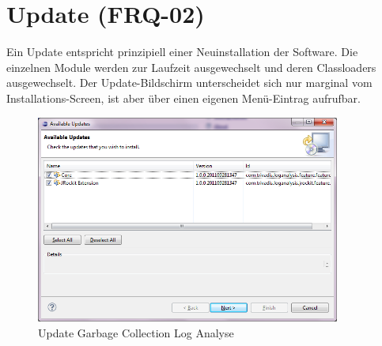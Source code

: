\section{Update (FRQ-02)}
Ein Update entspricht prinzipiell einer Neuinstallation der Software. Die einzelnen Module werden zur Laufzeit ausgewechselt und deren Classloaders ausgewechselt. Der Update-Bildschirm unterscheidet sich nur marginal vom Installations-Screen, ist aber über einen eigenen Menü-Eintrag aufrufbar.
 \begin{figure}[H]
  	\centering
    	\includegraphics[width=10cm]{images/tutorial_update01}
        	\caption{Update Garbage Collection Log Analyse}
\end{figure}

